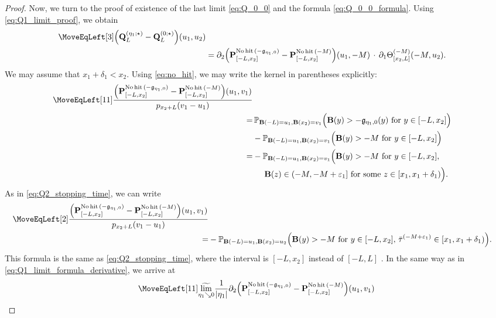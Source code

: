 \documentclass[oneside,final,11pt]{amsart}
\theoremstyle{definition}
\newcounter{assum}
\newcommand\nohit{\uptext{No\! hit}}
\newcommand{\fg}{\mathfrak{g}}
\newcommand{\mylim}[1]{\underset{#1}{\wt{\mathrm{lim}}}}
\newcommand{\1}[1]{\mathbf{1}_{#1}}
\newcommand{\eps}{\varepsilon}
\newcommand{\wt}{\widetilde}
\newcommand{\uptext}[1]{\text{\upshape{#1}}}
\newcommand{\fx}{x}
\newcommand{\fM}{M}
\newcommand{\fB}{\mathbf{B}}
\newcommand{\fP}{\mathbf{P}}
\newcommand{\fQ}{\mathbf{Q}}
\renewcommand{\P}{\mathbb P}
\numberwithin{equation}{section}
\begin{document}
\begin{proof}
Now, we turn to the proof of existence of the last limit \eqref{eq:Q_0_0} and the formula \eqref{eq:Q_0_0_formula}. Using \eqref{eq:Q1_limit_proof}, we obtain
\begin{equation}\label{eq:Q_star_formula}
\begin{split}
\MoveEqLeft[3]
\Bigl(\fQ_L^{(\eta_1; \star)} - \fQ_L^{(0; \star)}\Bigr) (u_1, u_2)\\
&= \partial_{2} \Bigl(\fP_{[-L,\fx_2]}^{\nohit\,(-\fg_{\eta_1, 0})} - \fP_{[-L,\fx_2]}^{\nohit\,(-\fM)} \Bigr) (u_1, -\fM) \,\cdot\, \partial_{1} \Theta^{(-\fM)}_{[\fx_2, L]} (-\fM, u_2).
\end{split}
\end{equation}
We may assume that $\fx_1 + \delta_1 < \fx_2$. Using \eqref{eq:no_hit}, we may write the kernel in parentheses explicitly:
\begin{align}
\MoveEqLeft[11]
\frac{\Bigl(\fP_{[-L,\fx_2]}^{\nohit\,(-\fg_{\eta_1, 0})} - \fP_{[-L,\fx_2]}^{\nohit\,(-\fM)} \Bigr) (u_1, v_1)}{p_{\fx_2 + L}(v_1 - u_1)}\\
=&\, \P_{\fB(-L)=u_1, \fB(\fx_2) = v_1}\Bigl(\fB(y)>-\fg_{\eta_1, 0}(y) \text{ for } y \in [-L,\fx_2]\Bigr) \\
& - \P_{\fB(-L)=u_1, \fB(\fx_2) = v_1}\Bigl(\fB(y)>-\fM \text{ for } y \in [-L,\fx_2]\Bigr)\\
=& - \P_{\fB(-L)=u_1, \fB(\fx_2) = v_1}\Bigl(\fB(y)>-\fM \text{ for } y \in [-L,\fx_2],\, \\
& \hspace{0.5cm} \fB(z) \in (-\fM, -\fM + \eps_1] \text{ for some } z \in [\fx_1, \fx_1 + \delta_1)\Bigr).
\end{align}
As in \eqref{eq:Q2_stopping_time}, we can write
\begin{align}
\MoveEqLeft[2]
\frac{\Bigl(\fP_{[-L,\fx_2]}^{\nohit\,(-\fg_{\eta_1, 0})} - \fP_{[-L,\fx_2]}^{\nohit\,(-\fM)} \Bigr) (u_1, v_1)}{p_{\fx_2 + L}(v_1 - u_1)} \\
=&-\P_{\fB(-L)=u_1, \fB(x_2)=u_2}\Bigl(\fB(y)>-M \text{ for } y \in [-L,x_2],\, \bar{\tau}^{(-\fM + \eps_1)} \in [\fx_1, \fx_1 + \delta_1)\Bigr).
\end{align}
This formula is the same as \eqref{eq:Q2_stopping_time}, where the interval is $[-L, x_2]$ instead of $[-L, L]$ . In the same way as in \eqref{eq:Q1_limit_formula_derivative}, we arrive at
\begin{align}
\MoveEqLeft[11]
\mylim{\eta_1 \searrow 0} \frac{1}{|\eta_1|} \partial_{2} \Bigl(\fP_{[-L,\fx_2]}^{\nohit\,(-\fg_{\eta_1, 0})} - \fP_{[-L,\fx_2]}^{\nohit\,(-\fM)}\Bigr)(u_1, v_1)\\

\end{align}
\end{proof}
\end{document}
